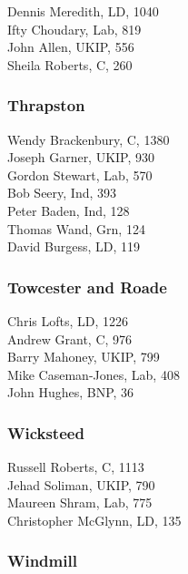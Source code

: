 \documentclass[a4paper,openany,10pt]{book}
\begin{document}
Dennis Meredith, LD, 1040\\
Ifty Choudary, Lab, 819\\
John Allen, UKIP, 556\\
Sheila Roberts, C, 260\\


\subsubsection*{Thrapston}



Wendy Brackenbury, C, 1380\\
Joseph Garner, UKIP, 930\\
Gordon Stewart, Lab, 570\\
Bob Seery, Ind, 393\\
Peter Baden, Ind, 128\\
Thomas Wand, Grn, 124\\
David Burgess, LD, 119\\


\subsubsection*{Towcester and Roade}



Chris Lofts, LD, 1226\\
Andrew Grant, C, 976\\
Barry Mahoney, UKIP, 799\\
Mike Caseman-Jones, Lab, 408\\
John Hughes, BNP, 36\\


\subsubsection*{Wicksteed}



Russell Roberts, C, 1113\\
Jehad Soliman, UKIP, 790\\
Maureen Shram, Lab, 775\\
Christopher McGlynn, LD, 135\\


\subsubsection*{Windmill}
\end{document}
